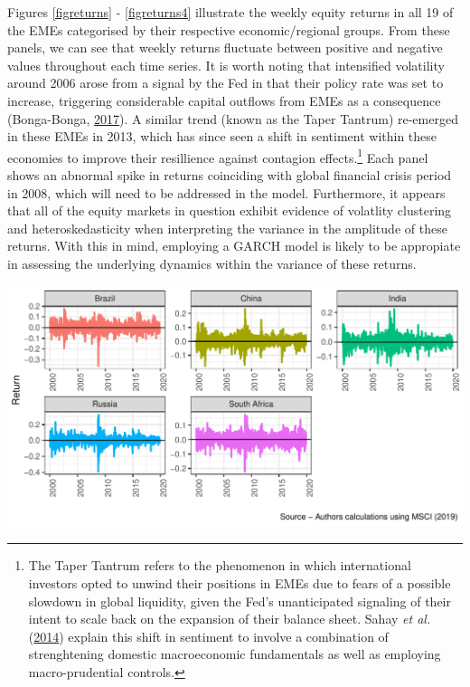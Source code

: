 \documentclass[11pt,preprint, authoryear]{elsarticle}
\let\origfigure\figure
\let\endorigfigure\endfigure
\renewenvironment{figure}[1][2] {
    \expandafter\origfigure\expandafter[H]
} {
    \endorigfigure
}
\numberwithin{equation}{section}
\numberwithin{figure}{section}
\numberwithin{table}{section}
\let\rmarkdownfootnote\footnote%
\def\footnote{\protect\rmarkdownfootnote}
\begin{document}
Figures \ref{figreturns} - \ref{figreturns4} illustrate the weekly
equity returns in all 19 of the EMEs categorised by their respective
economic/regional groups. From these panels, we can see that weekly
returns fluctuate between positive and negative values throughout each
time series. It is worth noting that intensified volatility around 2006
arose from a signal by the Fed in that their policy rate was set to
increase, triggering considerable capital outflows from EMEs as a
consequence (Bonga-Bonga, 
\protect\hyperlink{ref-bonga2017assessing}{2017}). A similar trend
(known as the Taper Tantrum) re-emerged in these EMEs in 2013, which has
since seen a shift in sentiment within these economies to improve their
resillience against contagion effects.\footnote{The Taper Tantrum refers
  to the phenomenon in which international investors opted to unwind
  their positions in EMEs due to fears of a possible slowdown in global
  liquidity, given the Fed's unanticipated signaling of their intent to
  scale back on the expansion of their balance sheet. Sahay \emph{et al.}
  (\protect\hyperlink{ref-sahay2014emerging}{2014}) explain this shift
  in sentiment to involve a combination of strenghtening domestic
  macroeconomic fundamentals as well as employing macro-prudential
  controls.} Each panel shows an abnormal spike in returns coinciding
with global financial crisis period in 2008, which will need to be
addressed in the model. Furthermore, it appears that all of the equity
markets in question exhibit evidence of volatlity clustering and
heteroskedasticity when interpreting the variance in the amplitude of
these returns. With this in mind, employing a GARCH model is likely to
be appropiate in assessing the underlying dynamics within the variance
of these returns.

\begin{figure}[H]

{\centering \includegraphics{Template_files/figure-latex/figreturns-1} 

}

\caption{Weekly Equity Returns - BRICS  \label{figreturns}}\label{fig:figreturns}
\end{figure}
\end{document}
